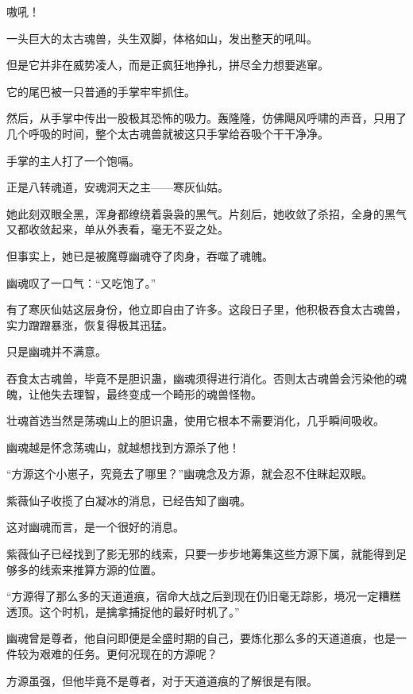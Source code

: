
\begin{this_body}

嗷吼！

一头巨大的太古魂兽，头生双脚，体格如山，发出整天的吼叫。

但是它并非在威势凌人，而是正疯狂地挣扎，拼尽全力想要逃窜。

它的尾巴被一只普通的手掌牢牢抓住。

然后，从手掌中传出一股极其恐怖的吸力。轰隆隆，仿佛飓风呼啸的声音，只用了几个呼吸的时间，整个太古魂兽就被这只手掌给吞吸个干干净净。

手掌的主人打了一个饱嗝。

正是八转魂道，安魂洞天之主——寒灰仙姑。

她此刻双眼全黑，浑身都缭绕着袅袅的黑气。片刻后，她收敛了杀招，全身的黑气又都收敛起来，单从外表看，毫无不妥之处。

但事实上，她已是被魔尊幽魂夺了肉身，吞噬了魂魄。

幽魂叹了一口气：“又吃饱了。”

有了寒灰仙姑这层身份，他立即自由了许多。这段日子里，他积极吞食太古魂兽，实力蹭蹭暴涨，恢复得极其迅猛。

只是幽魂并不满意。

吞食太古魂兽，毕竟不是胆识蛊，幽魂须得进行消化。否则太古魂兽会污染他的魂魄，让他失去理智，最终变成一个畸形的魂兽怪物。

壮魂首选当然是荡魂山上的胆识蛊，使用它根本不需要消化，几乎瞬间吸收。

幽魂越是怀念荡魂山，就越想找到方源杀了他！

“方源这个小崽子，究竟去了哪里？”幽魂念及方源，就会忍不住眯起双眼。

紫薇仙子收揽了白凝冰的消息，已经告知了幽魂。

这对幽魂而言，是一个很好的消息。

紫薇仙子已经找到了影无邪的线索，只要一步步地筹集这些方源下属，就能得到足够多的线索来推算方源的位置。

“方源得了那么多的天道道痕，宿命大战之后到现在仍旧毫无踪影，境况一定糟糕透顶。这个时机，是擒拿捕捉他的最好时机了。”

幽魂曾是尊者，他自问即便是全盛时期的自己，要炼化那么多的天道道痕，也是一件较为艰难的任务。更何况现在的方源呢？

方源虽强，但他毕竟不是尊者，对于天道道痕的了解很是有限。


\end{this_body}
